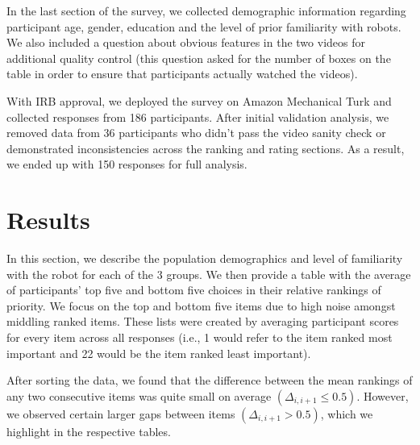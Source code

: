 \documentclass[letterpaper, 10 pt, conference]{ieeeconf}  %
\begin{document}
In the last section of the survey, we collected demographic information regarding participant age, gender, education and the level of prior familiarity with robots. We also included a question about obvious features in the two videos for additional quality control (this question asked for the number of boxes on the table in order to ensure that participants actually watched the videos).

With IRB approval, we deployed the survey on Amazon Mechanical Turk and collected responses from 186 participants. After initial validation analysis, we removed data from 36 participants who didn't pass the video sanity check or demonstrated inconsistencies across the ranking and rating sections. %
As a result, we ended up with 150 responses for full analysis.

\section{Results}
In this section, we describe the population demographics and level of familiarity with the robot for each of the 3 groups. We then provide a table with the average of participants' top five and bottom five choices in their relative rankings of priority. We focus on the top and bottom five items due to high noise amongst middling ranked items. These lists were created by averaging participant scores for every item across all responses (i.e., 1 would refer to the item ranked most important and 22 would be the item ranked least important).

After sorting the data, we found that the difference between the mean rankings of any two consecutive items was quite small on average $(\Delta_{i,i+1} \leq 0.5)$. However, we observed certain larger gaps between items $(\Delta_{i,i+1} > 0.5)$, which we highlight in the respective tables. %
\end{document}
